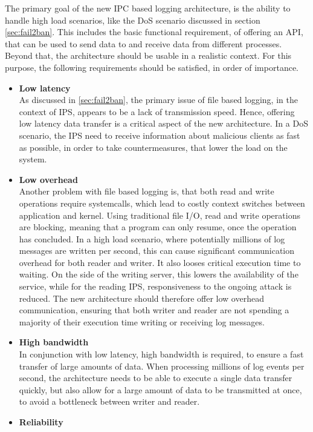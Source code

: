 The primary goal of the new \ac{IPC} based logging architecture, is the ability to handle high load scenarios, like the \ac{DoS} scenario discussed in section \ref{sec:fail2ban}.
This includes the basic functional requirement, of offering an API, that can be used to send data to and receive data from different processes. Beyond that,
the architecture should be usable in a realistic context. For this purpose, the following requirements should be satisfied, in order of importance.
\begin{itemize}
    \item \textbf{Low latency} \\
    As discussed in \ref{sec:fail2ban},  the primary issue of file based logging, in the context of \ac{IPS}, appears to be a lack of transmission speed. Hence,
    offering low latency data transfer is a critical aspect of the new architecture. In a \ac{DoS} scenario, the \ac{IPS} need to receive information
    about malicious clients as fast as possible, in order to take countermeasures, that lower the load on the system. 
    \item \textbf{Low overhead} \\
    Another problem with file based logging is, that both read and write operations require systemcalls, which lead to costly context switches between application and kernel. Using traditional
    file I/O, read and write operations are blocking, meaning that a program can only resume, once the operation has concluded. In a high load scenario, where potentially
    millions of log messages are written per second, this can cause significant communication overhead for both reader and writer. It also looses critical execution time to waiting.
   On the side of the writing server, this lowers the availability of the service, while for the reading \ac{IPS}, responsiveness to the ongoing attack is reduced. The new architecture should therefore offer low overhead communication,
    ensuring that both writer and reader are not spending a majority of their execution time writing or receiving log messages.
    \item \textbf{High bandwidth} \\
    In conjunction with  low latency, high bandwidth is required, to ensure a fast transfer of large amounts of data. When processing millions of log events per second, the architecture
    needs to be able to execute a single data transfer quickly, but also allow for a large amount of data to be transmitted at once, to avoid a bottleneck between writer and reader.
    \item \textbf{Reliability} \\

\end{itemize}
